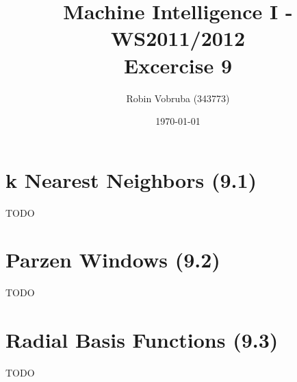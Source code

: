 \documentclass[a4paper,headings=small]{scrartcl}
\title{Machine Intelligence I - WS2011/2012\\Excercise 9}
\author{Robin Vobruba (343773)}
\date{\today}
\begin{document}
\maketitle


\section{k Nearest Neighbors (9.1)}

TODO


\section{Parzen Windows (9.2)}

TODO


\section{Radial Basis Functions (9.3)}

TODO
\end{document}

